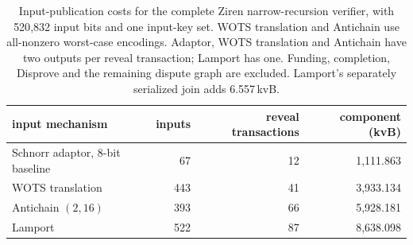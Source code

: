 \documentclass[11pt]{article}
\begin{document}
\begin{table}[t]\centering\small
\begin{tabular}{lrrr}\toprule
input mechanism & inputs & reveal transactions & component (kvB)\\\midrule
Schnorr adaptor, 8-bit baseline & 67 & 12 & 1{,}111.863\\
WOTS translation & 443 & 41 & 3{,}933.134\\
Antichain $(2,16)$ & 393 & 66 & 5{,}928.181\\
Lamport & 522 & 87 & 8{,}638.098\\\bottomrule
\end{tabular}
\caption{Input-publication costs for the complete Ziren narrow-recursion
verifier, with 520{,}832 input bits and one input-key set. WOTS translation
and Antichain use all-nonzero worst-case encodings. Adaptor, WOTS translation
and Antichain have two outputs per reveal transaction; Lamport has one.
Funding, completion, Disprove and the remaining dispute graph are excluded.
Lamport's separately serialized join adds 6.557\,kvB.}
\label{tab:ziren_publication}
\end{table}
\end{document}
